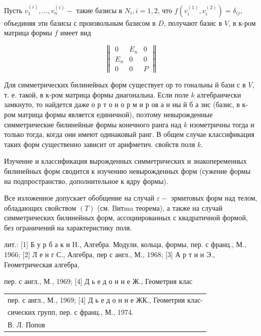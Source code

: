 \documentclass[10pt]{article}
\begin{document}
Пусть $v_{1}^{(i)}, \ldots, v_{n}^{(i)}-$ такие базисы в $N_{i}, i=1,2$, что $f\left(v_{i}^{(1)}, v_{i}^{(2)}\right)=\delta_{i j}$, объединяя эти базисы с произвольным базисом в $D$, получают базис в $V$, в к-ром матрица формы $f$ имеет вид



\[

\left\|\begin{array}{ccc}

0 & E_{n} & 0 \\

E_{n} & 0 & 0 \\

0 & 0 & P

\end{array}\right\|

\]



Для симметрических билинейных форм существует ор то гональны й бази с в $V$, т. е. такой, в к-ром матрица формы диагональна. Если поле $k$ алгебраически замкнуто, то найдется даже о р т о н о р м и р ов а н ны й б а зис (базис, в к-ром матрица формы является единичной), поэтому невырожденные симметрические билинейные формы конечного ранга над $k$ изометричны тогда и только тогда, когда они имеют одинаковый ранг. В общем случае классификация таких форм существенно зависит от арифметич. свойств поля $k$.



Изучение и классификация вырожденных симметрических и знакопеременных билинейных форм сводится к изучению невырожденных форм (сужение формы на подпространство, дополнительное к ядру формы).



Все изложенное допускает обобщение на случай $\varepsilon-$ эрмитовых форм над телом, обладающих свойством $(T)$ (см. Bитma теорема), а также на случай симметрических билинейных форм, ассоциированных с квадратичной формой, без ограничений на характеристику поля.



лит.: [1] Б у р б а к и H., Алгебра. Модули, кольца, формы, пер. с франц., М., 1966; [2] Л е н г С., Алгебра, пер с англ., М., 1968; [3] А р т и н Э., Геометрическая алгебра,



пер. с англ., М., 1969; [4] Д ь е д о н н е Ж., Геометрия клас\begin{tabular}{l}

пер. с англ., М., 1969; [4] Д ь е д о н н е ЖК., Геометрия клас- \\

сических групп, пер. с франц., М., 1974. \\

\hline

В. Л. Попов \\

\hline

\end{tabular}
\end{document}
